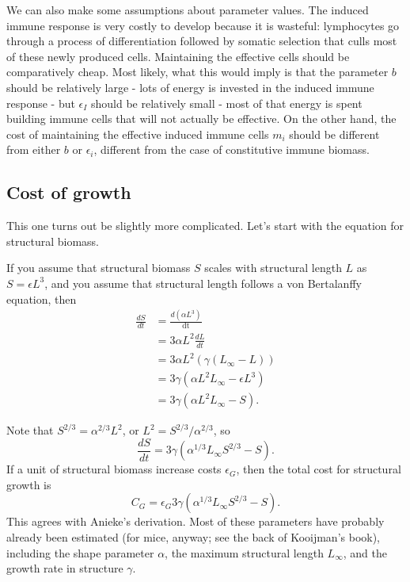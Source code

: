 \documentclass[11pt,reqno,final,pdftex]{amsart}\usepackage[]{graphicx}\usepackage[]{color}
\theoremstyle{plain}
\numberwithin{equation}{part}
\begin{document}
We can also make some assumptions about parameter values.
The induced immune response is very costly to develop because it is wasteful: lymphocytes go through a process of differentiation followed by somatic selection that culls most of these newly produced cells.
Maintaining the effective cells should be comparatively cheap.
Most likely, what this would imply is that the parameter $b$ should be relatively large - lots of energy is invested in the induced immune response - but $\epsilon_I$ should be relatively small - most of that energy is spent building immune cells that will not actually be effective.
On the other hand, the cost of maintaining the effective induced immune cells $m_i$ should be different from either $b$ or $\epsilon_i$, different from the case of constitutive immune biomass.

\subsection*{Cost of growth}
This one turns out be slightly more complicated.
Let's start with the equation for structural biomass.

If you assume that structural biomass $S$ scales with structural length $L$ as $S =\epsilon L^3$, and you assume that structural length
follows a von Bertalanffy equation, then
\begin{align}
\frac{dS}{dt} &=\frac{d\left(\alpha L^3\right)}{\text{dt}} \\
& =3\alpha  L^2 \frac{dL}{dt} \\
& =3 \alpha  L^2 \left(\gamma \left(L_{\infty}-L\right)\right) \\
& =3 \gamma \left(\alpha  L^2 L_{\infty}-\epsilon  L^3\right) \\
& =3 \gamma \left(\alpha  L^2L_{\infty }-S\right).
\end{align}

Note that $S^{2/3}=\alpha^{2/3}L^2$, or $L^2=S^{2/3}/\alpha^{2/3}$, so
\begin{equation}
\frac{dS}{dt}=3\gamma  \left(\alpha^{1/3}L_{\infty }S^{2/3}-S\right).
\end{equation}
If a unit of structural biomass increase costs $\epsilon_G$, then the total cost for structural growth is
\begin{equation}
C_G = \epsilon _G 3\gamma  \left(\alpha ^{1/3}L_{\infty }S^{2/3}-S\right).
\end{equation}
This agrees with Anieke's derivation.
Most of these parameters have probably already been estimated (for mice, anyway; see the back of Kooijman's book), including the shape parameter $\alpha$, the maximum structural length $L_{\infty }$, and the growth rate in structure $\gamma$.
\end{document}
